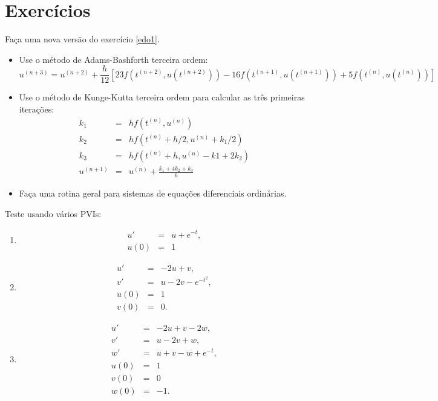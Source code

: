 \section{Exercícios}
\begin{exer}
Faça uma nova versão do exercício \ref{edo1}.
\begin{itemize}
 \item Use o método de Adams-Bashforth terceira ordem:
  \begin{equation}
  u^{(n+3)}=u^{(n+2)}+\frac{h}{12}\left[23f\left(t^{(n+2)},u(t^{(n+2)})\right)-16f\left(t^{(n+1)},u(t^{(n+1)})\right)+5f\left(t^{(n)},u(t^{(n)})\right)\right]
 \end{equation}
 \item Use o método de Kunge-Kutta terceira ordem para calcular as três primeiras iterações:
\begin{eqnarray*}
k_1&=&hf\left(t^{(n)},u^{(n)}\right)\\
k_2&=&hf\left(t^{(n)}+h/2,u^{(n)}+k_1/2\right)\\
k_3&=&hf\left(t^{(n)}+h,u^{(n)}-k1+2k_2\right)\\
u^{(n+1)}&=&u^{(n)}+\frac{k_1+4k_2+k_3}{6}
\end{eqnarray*}
\item Faça uma rotina geral para sistemas de equações diferenciais ordinárias.
\end{itemize}
Teste usando vários PVIs:
\begin{enumerate}
\item\begin{eqnarray*}
u' &=& u+e^{-t},\\
u(0)&=&1
\end{eqnarray*}
\item\begin{eqnarray*}
u' &=& -2u+v,\\
v' &=& u-2v-e^{-t^2},\\
u(0)&=&1\\
v(0)&=&0.
\end{eqnarray*}
\item\begin{eqnarray*}
u' &=& -2u+v-2w,\\
v' &=& u-2v+w,\\
w' &=& u+v-w+e^{-t},\\
u(0)&=&1\\
v(0)&=&0\\
w(0)&=&-1.
\end{eqnarray*}
\end{enumerate}
\end{exer}

